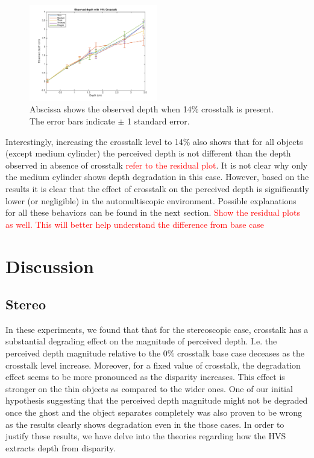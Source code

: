 \begin{figure}[H]
\centering
    \includegraphics[width=0.5\textwidth]{./Template_Figures/a_crosstalk_14}
    \caption{Abscissa shows the observed depth when 14\% crosstalk is present. The error bars indicate $\pm$ 1 standard error.\label{fig:a_crosstalk_14}}
\end{figure}
Interestingly, increasing the crosstalk level to 14\% also shows that for all objects (except medium cylinder) the perceived depth is not different than the depth observed in absence of crosstalk \textcolor{red}{refer to the residual plot}. It is not clear why only the medium cylinder shows depth degradation in this case. However, based on the results it is clear that the effect of crosstalk on the perceived depth is significantly lower (or negligible) in the automultiscopic environment. Possible explanations for all these behaviors can be found in the next section.
\textcolor{red}{Show the residual plots as well. This will better help understand the difference from base case}

\section {Discussion}
\subsection{Stereo}
In these experiments, we found that that for the stereoscopic case, crosstalk has a substantial degrading effect on the magnitude of perceived depth. I.e. the perceived depth magnitude relative to the 0\% crosstalk base case deceases as the crosstalk level increase. Moreover, for a fixed value of crosstalk, the degradation effect seems to be more pronounced as the disparity increases. This effect is stronger on the thin objects as compared to the wider ones. One of our initial hypothesis suggesting that the perceived depth magnitude might not be degraded once the ghost and the object separates completely was also proven to be wrong as the results clearly shows degradation even in the those cases. In order to justify these results, we have delve into the theories regarding how the HVS extracts depth from disparity.

